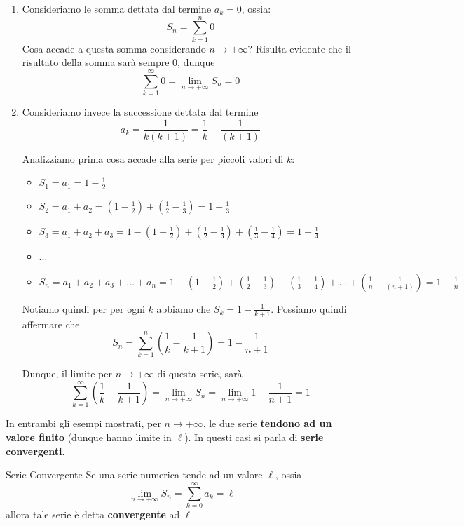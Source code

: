 \documentclass[a4paper, 12pt]{report}
\begin{document}
    \begin{enumerate}
        \item Consideriamo le somma dettata dal termine $a_k = 0$, ossia:
        \[S_n = \sum_{k = 1}^n 0\]
        Cosa accade a questa somma considerando $n \to +\infty$? Risulta evidente che il risultato della somma sarà sempre 0, dunque
        \[ \sum_{k = 1}^{\infty} 0 = \lim_{n \to +\infty} S_n = 0 \]
    
        \item Consideriamo  invece la successione dettata dal termine
        \[a_k = \frac{1}{k(k+1)} = \frac{1}{k} - \frac{1}{(k+1)}\]
        
        Analizziamo prima cosa accade alla serie per piccoli valori di $k$:
        \begin{itemize}
            \item $S_1 = a_1 = 1 - \frac{1}{2}$
            \item $S_2 = a_1 + a_2 = (1 - \frac{1}{2}) + (\frac{1}{2} - \frac{1}{3}) = 1 - \frac{1}{3}$
            \item $S_3 = a_1 + a_2 + a_3 = 1 - (1 - \frac{1}{2}) + (\frac{1}{2} - \frac{1}{3}) + (\frac{1}{3} - \frac{1}{4}) = 1 - \frac{1}{4}$
            \item ...
            \item $S_n = a_1 + a_2 + a_3 + \ldots + a_n = 1 - (1 - \frac{1}{2}) + (\frac{1}{2} - \frac{1}{3}) + (\frac{1}{3} - \frac{1}{4}) + \ldots + (\frac{1}{n} - \frac{1}{(n+1)})= 1 - \frac{1}{n}$
        \end{itemize}
        
        Notiamo quindi per per ogni $k$ abbiamo che $S_k = 1 - \frac{1}{k+1}$. Possiamo quindi affermare che
        \[S_n = \sum_{k = 1}^{n} \left (\frac{1}{k} - \frac{1}{k+1} \right ) = 1 - \frac{1}{n+1}\]
        
        Dunque, il limite per $n \to +\infty$ di questa serie, sarà
        \[ \sum_{k = 1}^{\infty} \left (\frac{1}{k} - \frac{1}{k+1} \right ) = \lim_{n \to +\infty} S_n = \lim_{n \to +\infty} 1 - \frac{1}{n+1} = 1\]
    \end{enumerate}
    
    In entrambi gli esempi mostrati, per $n \to +\infty$, le due serie \textbf{tendono ad un valore finito} (dunque hanno limite in $\ell$). In questi casi si parla di \textbf{serie convergenti}.
    
    \begin{frameddefn}{Serie Convergente}
        Se una serie numerica tende ad un valore $\ell$, ossia
        \[ \lim_{n \to +\infty} S_n = \sum_{k = 0}^{\infty} a_k = \ell\]    
        allora tale serie è detta \textbf{convergente} ad $\ell$
    \end{frameddefn}
    
\end{document}
